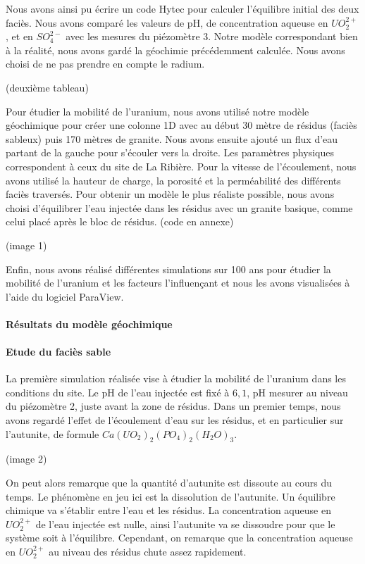 \documentclass{article}
\begin{document}
Nous avons ainsi pu écrire un code Hytec pour calculer l’équilibre initial des deux faciès. Nous avons comparé les valeurs de pH, de concentration aqueuse en $UO_2^{2+}$, et en $SO_4^{2-}$ avec les mesures du piézomètre 3. Notre modèle correspondant bien à la réalité, nous avons gardé la géochimie précédemment calculée. Nous avons choisi de ne pas prendre en compte le radium.
	
	(deuxième tableau)
	
Pour étudier la mobilité de l’uranium, nous avons utilisé notre modèle géochimique pour créer une colonne 1D avec au début 30 mètre de résidus (faciès sableux) puis 170 mètres de granite. Nous avons ensuite ajouté un flux d’eau partant de la gauche pour s’écouler vers la droite. Les paramètres physiques correspondent à ceux du site de La Ribière. Pour la vitesse de l’écoulement, nous avons utilisé la hauteur de charge, la porosité et la perméabilité des différents faciès traversés. Pour obtenir un modèle le plus réaliste possible, nous avons choisi d’équilibrer l’eau injectée dans les résidus avec un granite basique, comme celui placé après le bloc de résidus. (code en annexe)

(image 1)

Enfin, nous avons réalisé différentes simulations sur 100 ans pour étudier la mobilité de l’uranium et les facteurs l’influençant et nous les avons visualisées à l’aide du logiciel ParaView.


\paragraph{Résultats du modèle géochimique }
\paragraph{Etude du faciès sable}

La première simulation réalisée vise à étudier la mobilité de l’uranium dans les conditions du site. Le pH de l’eau injectée est fixé à $6,1$, pH mesurer au niveau du piézomètre 2, juste avant la zone de résidus. Dans un premier temps, nous avons regardé l’effet de l’écoulement d’eau sur les résidus, et en particulier sur l’autunite, de formule $Ca(UO_2)_2(PO_4)_2(H_2O)_3$.

(image 2)

On peut alors remarque que la quantité d’autunite est dissoute au cours du temps. Le phénomène en jeu ici est la dissolution de l’autunite. Un équilibre chimique va s’établir entre l’eau et les résidus. La concentration aqueuse en $UO_2^{2+}$ de l’eau injectée est nulle, ainsi l’autunite va se dissoudre pour que le système soit à l’équilibre. Cependant, on remarque que la concentration aqueuse en $UO_2^{2+}$ au niveau des résidus chute assez rapidement.
\end{document}
